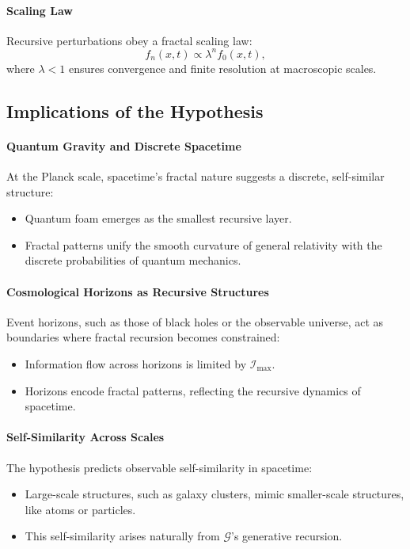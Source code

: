 \documentclass[12pt]{article}
\begin{document}
\paragraph{Scaling Law}
Recursive perturbations obey a fractal scaling law:
\[
f_n(x, t) \propto \lambda^n f_0(x, t),
\]
where \(\lambda < 1\) ensures convergence and finite resolution at macroscopic scales.

\subsection{Implications of the Hypothesis}

\paragraph{Quantum Gravity and Discrete Spacetime}
At the Planck scale, spacetime’s fractal nature suggests a discrete, self-similar structure:
\begin{itemize}
    \item Quantum foam emerges as the smallest recursive layer.
    \item Fractal patterns unify the smooth curvature of general relativity with the discrete probabilities of quantum mechanics.
\end{itemize}

\paragraph{Cosmological Horizons as Recursive Structures}
Event horizons, such as those of black holes or the observable universe, act as boundaries where fractal recursion becomes constrained:
\begin{itemize}
    \item Information flow across horizons is limited by \(\mathcal{I}_{\text{max}}\).
    \item Horizons encode fractal patterns, reflecting the recursive dynamics of spacetime.
\end{itemize}

\paragraph{Self-Similarity Across Scales}
The hypothesis predicts observable self-similarity in spacetime:
\begin{itemize}
    \item Large-scale structures, such as galaxy clusters, mimic smaller-scale structures, like atoms or particles.
    \item This self-similarity arises naturally from \(\mathcal{G}\)’s generative recursion.
\end{itemize}
\end{document}
